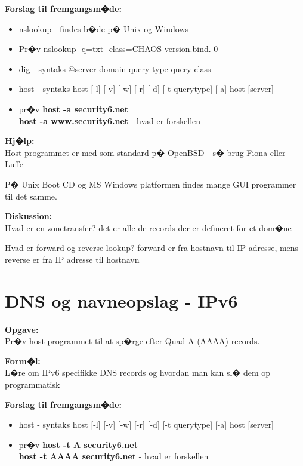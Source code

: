 \documentclass[a4paper,11pt,notitlepage]{oevelser}
\begin{document}
{\bfseries Forslag til fremgangsm�de:}\\
\begin{itemize}
\item nslookup - findes b�de p� Unix og Windows
\item Pr�v nslookup -q=txt -class=CHAOS version.bind. 0
\item dig - syntaks @server domain query-type query-class
\item host - syntaks host [-l] [-v] [-w] [-r] [-d] [-t querytype] [-a] host [server]
\item pr�v {\bfseries host -a security6.net} \\
{\bfseries host -a www.security6.net} - hvad er forskellen
\end{itemize}

{\bfseries Hj�lp:}\\
Host programmet er med som standard p� OpenBSD - s� brug Fiona eller Luffe

P� Unix Boot CD og MS Windows platformen findes mange GUI programmer til det samme.

{\bfseries Diskussion:}\\
Hvad er en zonetransfer? det er alle de records der er defineret for
et dom�ne

Hvad er forward og reverse lookup? forward er fra hostnavn til IP adresse,
mens reverse er fra IP adresse til hostnavn



\chapter{DNS og navneopslag - IPv6}
\label{ex:basic-dns-lookup6}

{\bfseries Opgave:}\\
Pr�v host programmet til at sp�rge efter Quad-A (AAAA) records.

{\bfseries Form�l:}\\
L�re om IPv6 specifikke DNS records og hvordan man kan sl� dem op programmatisk

{\bfseries Forslag til fremgangsm�de:}\\
\begin{itemize}
\item host - syntaks host [-l] [-v] [-w] [-r] [-d] [-t querytype] [-a] host [server]
\item pr�v {\bfseries host -t A security6.net} \\
{\bfseries host -t AAAA security6.net} - hvad er forskellen
\end{itemize}
\end{document}
